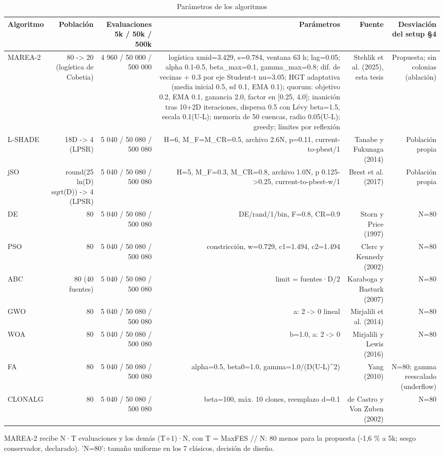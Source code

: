 \begin{table}[ht]\centering\small
\caption{Parámetros de los algoritmos}
\begin{tabular}{lrrrrr}
\toprule
Algoritmo & Población & Evaluaciones 5k / 50k / 500k & Parámetros & Fuente & Desviación del setup §4 \\
\midrule
MAREA-2 & 80 -> 20 (logística de Cobetia) & 4 960 / 50 000 / 500 000 & logística xmid=3.429, s=0.784, ventana 63 h; lag=0.05; alpha 0.1-0.5, beta\_max=0.1, gamma\_max=0.8; dif. de vecinas + 0.3 por eje Student-t nu=3.05; HGT adaptativa (media inicial 0.5, sd 0.1, EMA 0.1); quorum: objetivo 0.2, EMA 0.1, ganancia 2.0, factor en [0.25, 4.0]; inanición tras 10+2D iteraciones, dispersa 0.5 con Lévy beta=1.5, escala 0.1(U-L); memoria de 50 cuencas, radio 0.05(U-L); greedy; límites por reflexión & Stehlik et al. (2025), esta tesis & Propuesta; sin colonias (ablación) \\
L-SHADE & 18D -> 4 (LPSR) & 5 040 / 50 080 / 500 080 & H=6, M\_F=M\_CR=0.5, archivo 2.6N, p=0.11, current-to-pbest/1 & Tanabe y Fukunaga (2014) & Población propia \\
jSO & round(25 ln(D) sqrt(D)) -> 4 (LPSR) & 5 040 / 50 080 / 500 080 & H=5, M\_F=0.3, M\_CR=0.8, archivo 1.0N, p 0.125->0.25, current-to-pbest-w/1 & Brest et al. (2017) & Población propia \\
DE & 80 & 5 040 / 50 080 / 500 080 & DE/rand/1/bin, F=0.8, CR=0.9 & Storn y Price (1997) & N=80 \\
PSO & 80 & 5 040 / 50 080 / 500 080 & constricción, w=0.729, c1=1.494, c2=1.494 & Clerc y Kennedy (2002) & N=80 \\
ABC & 80 (40 fuentes) & 5 040 / 50 080 / 500 080 & limit = fuentes·D/2 & Karaboga y Basturk (2007) & N=80 \\
GWO & 80 & 5 040 / 50 080 / 500 080 & a: 2 -> 0 lineal & Mirjalili et al. (2014) & N=80 \\
WOA & 80 & 5 040 / 50 080 / 500 080 & b=1.0, a: 2 -> 0 & Mirjalili y Lewis (2016) & N=80 \\
FA & 80 & 5 040 / 50 080 / 500 080 & alpha=0.5, beta0=1.0, gamma=1.0/(D(U-L)^2) & Yang (2010) & N=80; gamma reescalado (underflow) \\
CLONALG & 80 & 5 040 / 50 080 / 500 080 & beta=100, máx. 10 clones, reemplazo d=0.1 & de Castro y Von Zuben (2002) & N=80 \\
\bottomrule
\end{tabular}
\par\footnotesize MAREA-2 recibe N·T evaluaciones y los demás (T+1)·N, con T = MaxFES // N: 80 menos para la propuesta (-1,6 \% a 5k; sesgo conservador, declarado). 'N=80': tamaño uniforme en los 7 clásicos, decisión de diseño.
\end{table}
